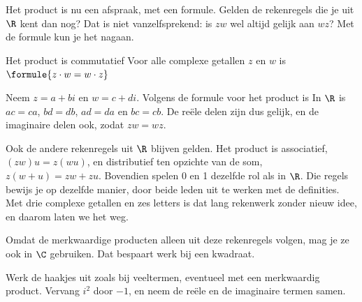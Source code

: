 Het product is nu een afspraak, met een formule. Gelden de rekenregels die je uit $\R$ kent dan nog? Dat is niet vanzelfsprekend: is $zw$ wel altijd gelijk aan $wz$? Met de formule kun je het nagaan.

\begin{theorie}
\begin{stelling}{Het product is commutatief}
Voor alle complexe getallen $z$ en $w$ is \quad $\formule{z \cdot w = w \cdot z}$
\end{stelling}

\begin{bewijs}
Neem $z = a + bi$ en $w = c + di$. Volgens de formule voor het product is
In $\R$ is $ac = ca$, $bd = db$, $ad = da$ en $bc = cb$. De reële delen zijn dus gelijk, en de imaginaire delen ook, zodat $zw = wz$.
\end{bewijs}
\end{theorie}

Ook de andere rekenregels uit $\R$ blijven gelden. Het product is associatief, $(zw)u = z(wu)$, en distributief ten opzichte van de som, $z(w + u) = zw + zu$. Bovendien spelen 0 en 1 dezelfde rol als in $\R$. Die regels bewijs je op dezelfde manier, door beide leden uit te werken met de definities. Met drie complexe getallen en zes letters is dat lang rekenwerk zonder nieuw idee, en daarom laten we het weg.

Omdat de merkwaardige producten alleen uit deze rekenregels volgen, mag je ze ook in $\C$ gebruiken. Dat bespaart werk bij een kwadraat.


\begin{werkwijze}
Werk de haakjes uit zoals bij veeltermen, eventueel met een merkwaardig product. Vervang $i^2$ door $-1$, en neem de reële en de imaginaire termen samen.
\end{werkwijze}


